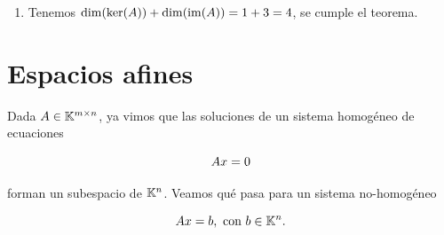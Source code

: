 \begin{ejemplo}
\begin{enumerate}
\begin{verbatim}
Matriz A escalonada:
 [[ 1.   0.  -2.   1. ]
 [ 0.   1.  -0.5 -1. ]
 [ 0.   0.   1.   0. ]]
\end{verbatim}



Obtenemos $x_3 = 0$, $x_2 - x_4 = 0$ y $x_1 + x_4=0$. Podemos despejar todas las variables $x_1$, $x_2$ y $x_3$ en función de $x_4$:
\begin{align*}
x_1 &= -x_4 \\
x_2 &= x_4  \\
x_3 &= 0   \\
\end{align*}

Luego, las soluciones del sistema son $\{(-x_4, x_4, 0, x_4): x_4 \in \R\} = \{x_4(-1, 1, 0, 1): x_4 \in \R\}$. Obtenemos $$
\ker(\Ab) = \langle (-1, 1, 0, 1) \rangle
$$ y $\dim(\ker(A)) = 1$.

En \python podemos calcular una base del núcleo de una matriz con el comando \texttt{null\_space} del paquete \texttt{scipy.linalg}. Para calcular una solución particular usamos eliminación gaussiana.

\item Tenemos $\dim(\ker(\Ab)) + \dim(\im(\Ab)) = 1 + 3 = 4$, se cumple el teorema.

\end{enumerate}

\end{ejemplo}




\section{Espacios afines}

Dada $\Ab \in \K^{m \times n}$, ya vimos que las soluciones de un sistema
homogéneo de ecuaciones

$$
\Ab\xb = 0
$$

forman un subespacio de $\mathbb K^n$. Veamos qué pasa para un sistema
no-homogéneo

$$
\Ab\xb = \bb, \text{ con } \bb \in \K^n.
$$

